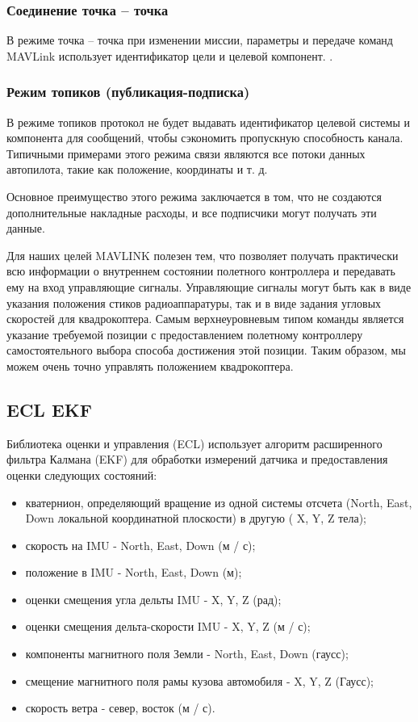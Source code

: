 \subsubsection{Соединение точка -- точка}
В режиме точка -- точка при изменении миссии, параметры и передаче команд MAV\-Link использует идентификатор цели и целевой компонент. \cite{mavlink}.

\subsubsection{Режим топиков (публикация-подписка)}
В режиме топиков протокол не будет выдавать идентификатор целевой системы и компонента для сообщений, чтобы сэкономить пропускную способность канала. Типичными примерами этого режима связи являются все потоки данных автопилота, такие как положение, координаты и т. д.

Основное преимущество этого режима заключается в том, что не создаются дополнительные накладные расходы, и все подписчики могут получать эти данные.

Для наших целей MAVLINK полезен тем, что позволяет получать практически всю информации о внутреннем состоянии полетного контроллера и передавать ему на вход управляющие сигналы. Управляющие сигналы могут быть как в виде указания положения стиков радиоаппаратуры, так и в виде задания угловых скоростей для квадрокоптера. Самым верхнеуровневым типом команды является указание требуемой позиции с предоставлением полетному контроллеру самостоятельного выбора способа достижения этой позиции. Таким образом, мы можем очень точно управлять положением квадрокоптера.

\subsection{ECL EKF}
Библиотека оценки и управления (ECL) использует алгоритм расширенного фильтра Калмана (EKF) для обработки измерений датчика и предоставления оценки следующих состояний:
\begin{itemize}
	\item кватернион, определяющий вращение из одной системы отсчета (North, East, Down локальной координатной плоскости) в другую ( X, Y, Z тела);
	\item скорость на IMU - North, East, Down (м / с);
	\item положение в IMU - North, East, Down (м);
	\item оценки смещения угла дельты IMU - X, Y, Z (рад);
	\item оценки смещения дельта-скорости IMU - X, Y, Z (м / с);
	\item компоненты магнитного поля Земли - North, East, Down (гаусс);
	\item смещение магнитного поля рамы кузова автомобиля - X, Y, Z (Гаусс);
	\item скорость ветра - север, восток (м / с).
\end{itemize}

